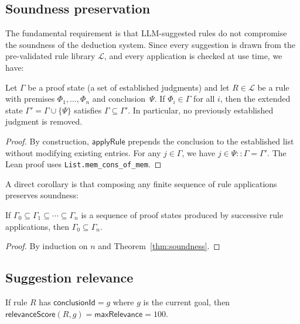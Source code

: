 \documentclass[11pt]{article}
\newcommand{\LLM}{\textsc{LLM}}
\begin{document}
\subsection{Soundness preservation}\label{ssec:soundness}

The fundamental requirement is that \LLM{}-suggested rules do not
compromise the soundness of the deduction system.  Since every
suggestion is drawn from the pre-validated rule library
$\mathcal{L}$, and every application is checked at use time, we
have:

\begin{theorem}\label{thm:soundness}
  Let $\Gamma$ be a proof state (a set of established judgments)
  and let $R \in \mathcal{L}$ be a rule with premises
  $\Phi_1, \ldots, \Phi_n$ and conclusion~$\Psi$.  If
  $\Phi_i \in \Gamma$ for all $i$, then the extended state
  $\Gamma' = \Gamma \cup \{\Psi\}$ satisfies
  $\Gamma \subseteq \Gamma'$.  In particular, no previously
  established judgment is removed.
\end{theorem}

\begin{proof}
  By construction, $\mathsf{applyRule}$ prepends the conclusion to
  the established list without modifying existing entries.  For any
  $j \in \Gamma$, we have $j \in \Psi :: \Gamma = \Gamma'$.  The
  Lean proof uses \texttt{List.mem\_cons\_of\_mem}.
\end{proof}

\noindent
A direct corollary is that composing any finite sequence of rule
applications preserves soundness:

\begin{corollary}\label{cor:soundness-seq}
  If $\Gamma_0 \subseteq \Gamma_1 \subseteq \cdots \subseteq
  \Gamma_n$ is a sequence of proof states produced by successive
  rule applications, then $\Gamma_0 \subseteq \Gamma_n$.
\end{corollary}

\begin{proof}
  By induction on $n$ and Theorem~\ref{thm:soundness}.
\end{proof}

\subsection{Suggestion relevance}\label{ssec:relevance}

\begin{theorem}\label{thm:relevance}
  If rule $R$ has $\mathsf{conclusionId} = g$ where $g$ is the
  current goal, then $\mathsf{relevanceScore}(R, g) =
  \mathsf{maxRelevance} = 100$.
\end{theorem}
\end{document}
